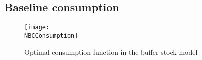 \subsection{Baseline consumption}\label{consumption_baseline}

\begin{figure}[H]
    \centering
    \texttt{[image: \\NBCConsumption]}
    \caption{Optimal consumption function in the buffer-stock model}
    \label{fig:baseline_consumption}
\end{figure}